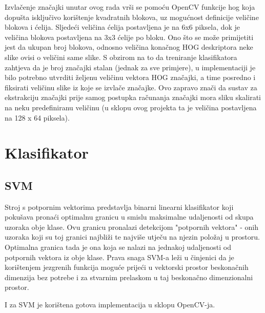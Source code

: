 \documentclass[utf8, seminar, numeric, times]{fer}
\begin{document}
Izvlačenje značajki unutar ovog rada vrši se pomoću OpenCV funkcije hog koja dopušta isključivo korištenje kvadratnih blokova, uz mogućnost definicije veličine blokova i ćelija. Sljedeći \cite{hog1} veličina ćelija postavljena je na 6x6 piksela, dok je veličina blokova postavljena na 3x3 ćelije po bloku. Ono što se može primijetiti jest da ukupan broj blokova, odnosno veličina konačnog HOG deskriptora neke slike ovisi o veličini same slike. S obzirom na to da treniranje klasifikatora zahtjeva da je broj značajki stalan (jednak za sve primjere), u implementaciji je bilo potrebno utvrditi željenu veličinu vektora HOG značajki, a time posredno i fiksirati veličinu slike iz koje se izvlače značajke. Ovo zapravo znači da sustav za ekstrakciju značajki prije samog postupka računanja značajki mora sliku skalirati na neku predefiniranu veličinu (u sklopu ovog projekta ta je veličina postavljena na 128 x 64 piksela).

\section{Klasifikator}
\subsection{SVM}
Stroj s potpornim vektorima predstavlja binarni linearni klasifikator koji pokušava pronaći optimalnu granicu u smislu maksimalne udaljenosti od skupa uzoraka obje klase. Ovu granicu pronalazi detekcijom "potpornih vektora" - onih uzoraka koji su toj granici najbliži te najviše utječu na njezin položaj u prostoru. Optimalna granica tada je ona koja se nalazi na jednakoj udaljenosti od potpornih vektora iz obje klase. Prava snaga SVM-a leži u činjenici da je korištenjem jezgrenih funkcija moguće prijeći u vektorski prostor beskonačnih dimenzija bez potrebe i za stvarnim prelaskom u taj beskonačno dimenzionalni prostor.

I za SVM je korištena gotova implementacija u sklopu OpenCV-ja.
\end{document}
